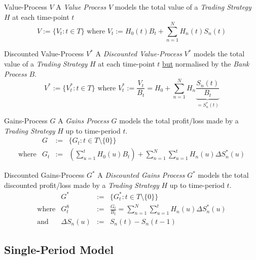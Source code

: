 \documentclass[11pt,a4paper]{article}
\begin{document}
  \begin{definition}{Value-Process $V$}\label{def_value_process}
    A \textit{Value Process} $V$ models the total value of a \textit{Trading Strategy} $H$ at each time-point $t$
    \[ V:=\{V_t:t\in T\}\text{ where }V_t:=H_0(t)B_t+\sum_{n=1}^NH_n(t)S_n(t) \]
  \end{definition}

  \begin{definition}{Discounted Value-Process $V^*$}\label{def_discounted_value_process}
    A \textit{Discounted Value-Process} $V^*$ models the total value of a \textit{Trading Strategy} $H$ at each time-point $t$ \underline{but} normalised by the \textit{Bank Process} $B$.
    \[ V^*:=\{V_t^*:t\in T\}\text{ where }V_t^*:=\frac{V_t}{B_t}=H_0+\sum_{n=1}^NH_n\underbrace{\frac{S_n(t)}{B_t}}_{=S_n^*(t)} \]
  \end{definition}

  \begin{definition}{Gains-Process $G$}\label{def_gains_process}
    A \textit{Gains Process} $G$ models the total profit/loss made by a \textit{Trading Strategy} $H$ up to time-period $t$.
    \[\begin{array}{rrcl}
      &G&:=&\{G_t:t\in T\setminus\{0\}\}\\
      \text{where}&G_t&:=&\left(\sum_{u=1}^tH_0(u)B_t\right)+\sum_{n=1}^N\sum_{u=1}^tH_n(u)\Delta S_n^*(u)
    \end{array}\]
  \end{definition}

  \begin{definition}{Discounted Gains-Process $G^*$}\label{def_discounted_gains_process}
    A \textit{Discounted Gains Process} $G^*$ models the total discounted profit/loss made by a \textit{Trading Strategy} $H$ up to time-period $t$.
    \[\begin{array}{rrcl}
      &G^*&:=&\{G_t^*:t\in T\setminus\{0\}\}\\
      \text{where}&G_t^8&:=&\frac{G_t}{B_t}=\sum_{n=1}^N\sum_{u=1}^tH_n(u)\Delta S_n^*(u)\\
      \text{and}&\Delta S_n(u)&:=&S_n(t)-S_n(t-1)
    \end{array}\]
  \end{definition}

\subsection{Single-Period Model}
\end{document}
